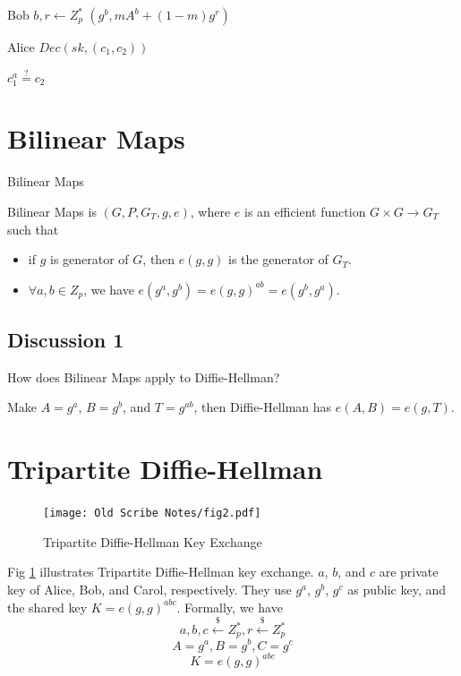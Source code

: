 \documentclass[12pt]{tufte-book}
\begin{document}
Bob
$b,r \gets Z^*_p$
$(g^b, mA^b+(1-m)g^r)$

Alice $Dec(sk, (c_1, c_2))$

$c_1^a \stackrel{?}{=} c_2$




\section{Bilinear Maps}

\begin{definition}{Bilinear Maps}

Bilinear Maps is $(G,P,G_T,g,e)$, where $e$ is an efficient function $G \times G \to G_T$ such that

\begin{itemize}
\item if $g$ is generator of $G$, then $e(g, g)$ is the generator of $G_T$.
\item $\forall a,b \in Z_p$, we have $e(g^a, g^b) = e(g, g)^{ab} = e(g^b, g^a)$.
\end{itemize}

\end{definition}

\subsection{Discussion 1}


How does Bilinear Maps apply to Diffie-Hellman?

Make $A=g^a$, $B=g^b$, and $T=g^{ab}$, then Diffie-Hellman has $e(A, B)=e(g, T)$.


\section{Tripartite Diffie-Hellman}

\begin{figure}
\label{fig:3dh}
\centering
  \texttt{[image: Old Scribe Notes/fig2.pdf]}
\caption{Tripartite Diffie-Hellman Key Exchange}
\end{figure}

Fig \ref{fig:3dh} illustrates Tripartite Diffie-Hellman key exchange. $a$, $b$, and $c$ are private key of Alice, Bob, and Carol, respectively.
They use $g^a$, $g^b$, $g^c$ as public key, and the shared key $K=e(g,g)^{abc}$.
Formally, we have
$$a,b,c \stackrel{\$}{\gets} Z^*_p, r \stackrel{\$}{\gets} Z^*_p$$
$$A=g^a, B=g^b, C=g^c$$
$$K=e(g,g)^{abc}$$
\end{document}
